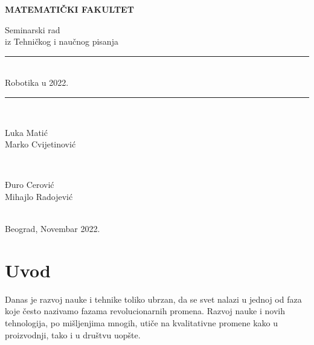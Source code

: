\documentclass{article}
\newcommand{\HRule}{\rule{\linewidth}{0.5mm}}
\begin{document}
	\vspace*{5cm}
	\thispagestyle{empty}
	\centerline{\huge \textbf{MATEMATIČKI FAKULTET}}
	\vspace{2cm}
	
	\begin{center}
		
		{\Large Seminarski rad}\\
		{\Large	iz Tehničkog i naučnog pisanja}\\
		\Huge\HRule\\[0.4cm] %
		{Robotika u 2022.}\\
		\HRule \\[20pt] %
		\begin{minipage}{0.4\textwidth}
			\begin{flushleft} \large
				{\Large Luka Matić}\\
				{\Large Marko Cvijetinović}
			\end{flushleft}
		\end{minipage}
		~
		\begin{minipage}{0.4\textwidth}
			\begin{flushright} \large
				{\Large Đuro Cerović} \\
				{\Large Mihajlo Radojević}\\ 
			\end{flushright}
		\end{minipage}\\[5cm]
		\Large{Beograd, Novembar 2022.}
	\end{center}
	\pagebreak
 \begin{abstract}
     
      Navedeni su i objašnjeni zakoni robotike, definisani radi bezbednosti društva. Istaknut je razvoj i primena robotike u 2022. godini, kako u industriji, tako i u svakodnevnom životu. U radu su razrađene teme o: saradničkim robotima, robotima dostavljačima, prediktivnom održavanju, povećanju kompatibilnosti, kuhinjskim robotima i primeni veštačke inteligencije u robotici. Diskutovana je esencijalna važnost robotike u današnjici.
    
 \end{abstract}
	\tableofcontents
    \pagebreak
	\section{Uvod}
	
	Danas je razvoj nauke i tehnike toliko ubrzan, da se svet nalazi u jednoj od faza koje često nazivamo fazama revolucionarnih promena. Razvoj nauke i novih tehnologija, po mišljenjima mnogih, utiče na kvalitativne promene kako u proizvodnji, tako i u društvu uopšte.
	
\end{document}
